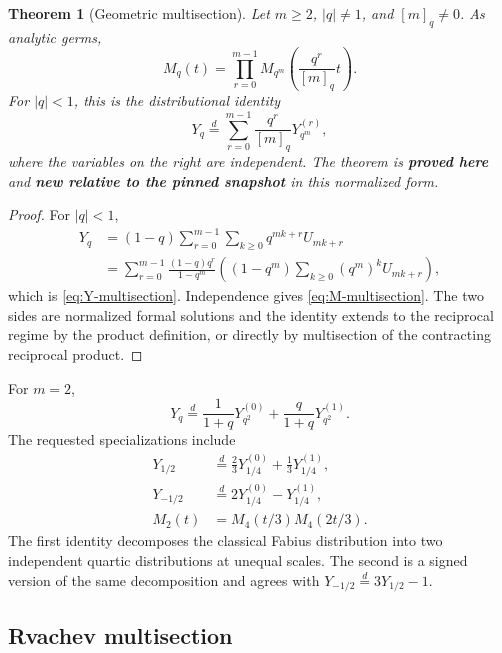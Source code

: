 \documentclass[11pt,oneside]{article}
\numberwithin{equation}{section}
\newtheorem{theorem}{Theorem}[section]
\theoremstyle{definition}
\theoremstyle{remark}
\newcommand{\proved}{\textcolor{deepgreen}{\textbf{proved here}}}
\newcommand{\auditnew}{\textcolor{deepviolet}{\textbf{new relative to the pinned snapshot}}}
\begin{document}
\begin{theorem}[Geometric multisection]
\label{thm:geometric-multisection}
Let $m\ge2$, $|q|\ne1$, and $[m]_q\ne0$.  As analytic germs,
\begin{equation}
 \boxed{
 M_q(t)=\prod_{r=0}^{m-1}
 M_{q^m}\!\left(\frac{q^r}{[m]_q}t\right).}
 \label{eq:M-multisection}
\end{equation}
For $|q|<1$, this is the distributional identity
\begin{equation}
 \boxed{
 Y_q\stackrel d=
 \sum_{r=0}^{m-1}\frac{q^r}{[m]_q}Y_{q^m}^{(r)},}
 \label{eq:Y-multisection}
\end{equation}
where the variables on the right are independent.  The theorem is \proved{}
and \auditnew{} in this normalized form.
\end{theorem}

\begin{proof}
For $|q|<1$,
\begin{align*}
 Y_q
 &=(1-q)\sum_{r=0}^{m-1}\sum_{k\ge0}q^{mk+r}U_{mk+r}\\
 &=\sum_{r=0}^{m-1}
 \frac{(1-q)q^r}{1-q^m}
 \left((1-q^m)\sum_{k\ge0}(q^m)^kU_{mk+r}\right),
\end{align*}
which is \eqref{eq:Y-multisection}.  Independence gives
\eqref{eq:M-multisection}.  The two sides are normalized formal solutions and
the identity extends to the reciprocal regime by the product definition, or
directly by multisection of the contracting reciprocal product.
\end{proof}

For $m=2$,
\begin{equation}
 Y_q\stackrel d=
 \frac1{1+q}Y_{q^2}^{(0)}+
 \frac q{1+q}Y_{q^2}^{(1)}.
 \label{eq:Y-decimation-two}
\end{equation}
The requested specializations include
\begin{align}
 Y_{1/2}&\stackrel d=\frac23Y_{1/4}^{(0)}+\frac13Y_{1/4}^{(1)},
 \label{eq:Fabius-quartic-convolution}\\
 Y_{-1/2}&\stackrel d=2Y_{1/4}^{(0)}-Y_{1/4}^{(1)},
 \label{eq:negative-half-quartic}\\
 M_2(t)&=M_4(t/3)M_4(2t/3).
 \label{eq:reciprocal-decimation}
\end{align}
The first identity decomposes the classical Fabius distribution into two
independent quartic distributions at unequal scales.  The second is a signed
version of the same decomposition and agrees with
$Y_{-1/2}\stackrel d=3Y_{1/2}-1$.

\subsection{Rvachev multisection}
\end{document}
